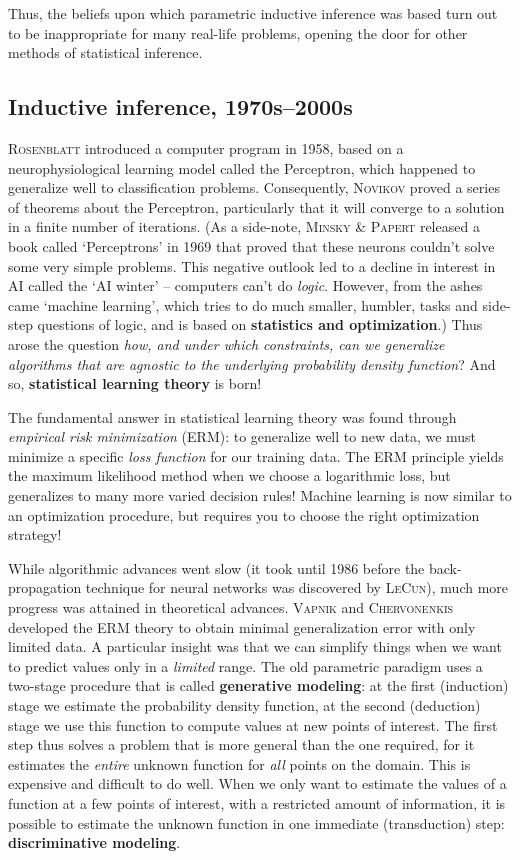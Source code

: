 \documentclass{article}
\begin{document}
Thus, the beliefs upon which parametric inductive inference was based turn out to be inappropriate for many real-life problems, opening the door for other methods of statistical inference.

\subsection{Inductive inference, 1970s--2000s}
\textsc{Rosenblatt} introduced a computer program in 1958, based on a neurophysiological learning model called the Perceptron, which happened to generalize well to classification problems. Consequently, \textsc{Novikov} proved a series of theorems about the Perceptron, particularly that it will converge to a solution in a finite number of iterations. (As a side-note, \textsc{Minsky \& Papert} released a book called `Perceptrons' in 1969 that proved that these neurons couldn't solve some very simple problems. This negative outlook led to a decline in interest in AI called the `AI winter' -- computers can't do \textit{logic}. However, from the ashes came `machine learning', which tries to do much smaller, humbler, tasks and side-step questions of logic, and is based on \textbf{statistics and optimization}.) Thus arose the question \textit{how, and under which constraints, can we generalize algorithms that are agnostic to the underlying probability density function}? And so, \textbf{statistical learning theory} is born!

The fundamental answer in statistical learning theory was found through \textit{empirical risk minimization} (ERM): to generalize well to new data, we must minimize a specific \textit{loss function} for our training data. The ERM principle yields the maximum likelihood method when we choose a logarithmic loss, but generalizes to many more varied decision rules! Machine learning is now similar to an optimization procedure, but requires you to choose the right optimization strategy!

While algorithmic advances went slow (it took until 1986 before the back-propagation technique for neural networks was discovered by \textsc{LeCun}), much more progress was attained in theoretical advances. \textsc{Vapnik} and \textsc{Chervonenkis} developed the ERM theory to obtain minimal generalization error with only limited data. A particular insight was that we can simplify things when we want to predict values only in a \textit{limited} range. The old parametric paradigm uses a two-stage procedure that is called \textbf{generative modeling}: at the first (induction) stage we estimate the probability density function, at the second (deduction) stage we use this function to compute values at new points of interest. The first step thus solves a problem that is more general than the one required, for it estimates the \textit{entire} unknown function for \textit{all} points on the domain. This is expensive and difficult to do well. When we only want to estimate the values of a function at a few points of interest, with a restricted amount of information, it is possible to estimate the unknown function in one immediate (transduction) step: \textbf{discriminative modeling}.
\end{document}
